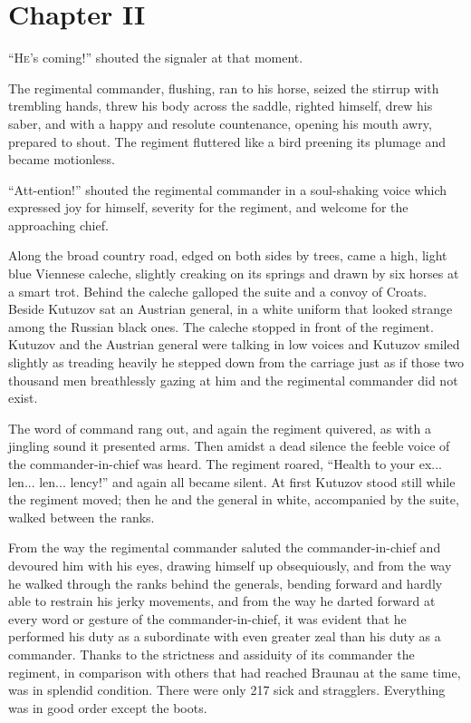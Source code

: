 \chapter*{Chapter II}
\ifaudio     {} \fi

\lettrine[lines=1, loversize=0.3, lraise=0]{``\initfamily H}{e}'s coming!'' shouted the signaler at that moment.

The regimental commander, flushing, ran to his horse, seized the
stirrup with trembling hands, threw his body across the saddle,
righted himself, drew his saber, and with a happy and resolute
countenance, opening his mouth awry, prepared to shout. The
regiment fluttered like a bird preening its plumage and became
motionless.

``Att-ention!'' shouted the regimental commander in a
soul-shaking voice which expressed joy for himself, severity for
the regiment, and welcome for the approaching chief.

Along the broad country road, edged on both sides by trees, came
a high, light blue Viennese caleche, slightly creaking on its
springs and drawn by six horses at a smart trot. Behind the
caleche galloped the suite and a convoy of Croats. Beside Kutuzov
sat an Austrian general, in a white uniform that looked strange
among the Russian black ones. The caleche stopped in front of the
regiment. Kutuzov and the Austrian general were talking in low
voices and Kutuzov smiled slightly as treading heavily he stepped
down from the carriage just as if those two thousand men
breathlessly gazing at him and the regimental commander did not
exist.

The word of command rang out, and again the regiment quivered, as
with a jingling sound it presented arms. Then amidst a dead
silence the feeble voice of the commander-in-chief was heard. The
regiment roared, ``Health to your ex... len... len... lency!''
and again all became silent. At first Kutuzov stood still while
the regiment moved; then he and the general in white, accompanied
by the suite, walked between the ranks.

From the way the regimental commander saluted the
commander-in-chief and devoured him with his eyes, drawing
himself up obsequiously, and from the way he walked through the
ranks behind the generals, bending forward and hardly able to
restrain his jerky movements, and from the way he darted forward
at every word or gesture of the commander-in-chief, it was
evident that he performed his duty as a subordinate with even
greater zeal than his duty as a commander. Thanks to the
strictness and assiduity of its commander the regiment, in
comparison with others that had reached Braunau at the same time,
was in splendid condition. There were only 217 sick and
stragglers. Everything was in good order except the boots.

